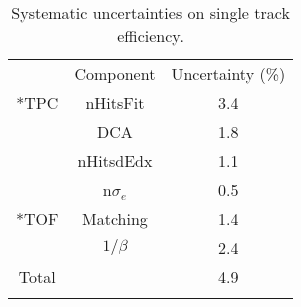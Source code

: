 \begin{table}[htp]
\centering
\caption{Systematic uncertainties on single track efficiency.}
\label{singletrkeffuncertainty}
\begin{tabular}{ccc}
\Xhline{1.6pt}
 & Component & Uncertainty (\%) \\
\Xhline{1.2pt}
\multirow{4}*{TPC} & nHitsFit & 3.4\\ 
& DCA & 1.8 \\
& nHitsdEdx & 1.1 \\
& n$\sigma_{e}$ & 0.5 \\ 
\Xhline{1.2pt}
 \multirow{2}*{TOF} & Matching & 1.4 \\
 & $1/\beta$ & 2.4 \\
 \Xhline{1.2pt}
 Total && 4.9 \\
\Xhline{1.6pt}
\end{tabular}
\end{table}

